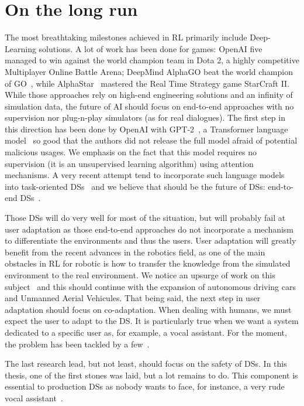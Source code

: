 \section{On the long run}
\label{sec:perspective}

The most breathtaking milestones achieved in \gls{RL}  primarily include Deep-Learning solutions. A lot of work has been done for games: OpenAI five~\parencite{OpenAIdota} managed to win against the world champion team in  Dota 2, a highly competitive Multiplayer Online Battle Arena; DeepMind AlphaGO beat the world champion of GO~\parencite{alphago}, while AlphaStar~\parencite{alphastar} mastered the Real Time Strategy game StarCraft II. While those approaches rely on high-end engineering solutions and an infinity of simulation data, the future of \gls{AI} should focus on end-to-end approaches with no supervision nor plug-n-play simulators (as for real dialogues).
The first step in this direction has been done by OpenAI with GPT-2~\parencite{radford2019language}, a Transformer language model~\parencite{radford2019language} so good that the authors did not release the full model afraid of potential malicious usages.  We emphasis on the fact that this model requires no supervision (it is an unsupervised learning algorithm) using attention mechanisms. A very recent attempt tend to incorporate such language models into task-oriented \glspl{DS}~\parencite{gpt2taskoriented} and we believe that should be the future of \glspl{DS}: end-to-end \glspl{DS}~\parencite{serban2016building,li2017end}.

Those \glspl{DS} will do very well for most of the situation, but will probably fail at user adaptation as those end-to-end approaches do not incorporate a mechanism to differentiate the environments and thus the users. User adaptation will greatly benefit from the recent advances in the robotics field, as one of the main obstacles in \gls{RL} for robotic is how to transfer the knowledge from the simulated environment to the real environment. We notice an upsurge of work on this subject~\parencite{kang2019generalization,uav} and this should continue with the expansion of autonomous driving cars and Unmanned Aerial Vehicules. That being said, the next step in user adaptation should focus on co-adaptation. When dealing with humans, we must expect the user to adapt  to the \gls{DS}. It is particularly true when we want a system dedicated to a specific user as, for example, a vocal assistant. For the moment, the problem has been tackled by a few~\parencite{chandramohan2014co,barlier2015human}.

The last research lead, but not least, should focus on the safety of \glspl{DS}. In this thesis, one of the first stones was laid, but a lot remains to do. This component is essential to production \glspl{DS} as nobody wants to face, for instance, a very rude vocal assistant~\parencite{techcrunch}.
